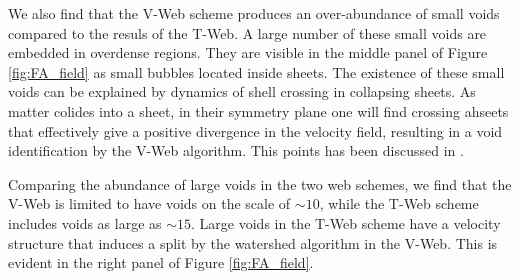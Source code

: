 \documentclass[a4,useAMS,usenatbib,usegraphicx]{mn2e}
\newcommand{\hMpc}{{\ifmmode{h^{-1}{\rm Mpc}}\else{$h^{-1}$Mpc}\fi}}
\begin{document}
We also find that the V-Web scheme produces an over-abundance of small
voids compared to the resuls of the T-Web.
A large number of these small voids are embedded in overdense regions. 
They are visible in the middle panel of Figure \ref{fig:FA_field} as
small bubbles located inside sheets.
The existence of these small voids can be explained by
dynamics of shell crossing in collapsing sheets. 
As matter colides into a sheet, in their symmetry plane one will
find crossing ahseets that effectively give a positive divergence in
the velocity field, resulting in a void identification by the
V-Web algorithm. This points has been discussed in \citet{Hoffman12}.  

Comparing the abundance of large voids in the two web schemes, we find
that the V-Web is limited to have voids on the scale of $\sim 10$\hMpc,
while the T-Web scheme includes voids as large as $\sim 15$\hMpc. 
Large voids in the T-Web scheme have a velocity structure that
induces a split by the watershed algorithm in the V-Web. 
This is evident in the right panel of Figure \ref{fig:FA_field}.
\end{document}
